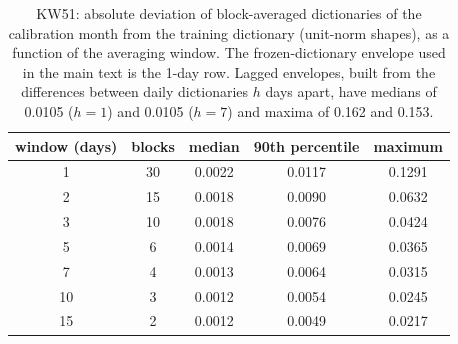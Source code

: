 \begin{table}[h]\centering\footnotesize
\caption{KW51: absolute deviation of block-averaged dictionaries of the calibration month from the training dictionary (unit-norm shapes), as a function of the averaging window. The frozen-dictionary envelope used in the main text is the 1-day row. Lagged envelopes, built from the differences between daily dictionaries $h$ days apart, have medians of 0.0105 ($h=1$) and 0.0105 ($h=7$) and maxima of 0.162 and 0.153.}\label{tab:s3}
\begin{tabular}{ccccc}\toprule
window (days) & blocks & median & 90th percentile & maximum\\ \midrule
1 & 30 & 0.0022 & 0.0117 & 0.1291 \\
2 & 15 & 0.0018 & 0.0090 & 0.0632 \\
3 & 10 & 0.0018 & 0.0076 & 0.0424 \\
5 & 6 & 0.0014 & 0.0069 & 0.0365 \\
7 & 4 & 0.0013 & 0.0064 & 0.0315 \\
10 & 3 & 0.0012 & 0.0054 & 0.0245 \\
15 & 2 & 0.0012 & 0.0049 & 0.0217 \\
\bottomrule\end{tabular}\end{table}